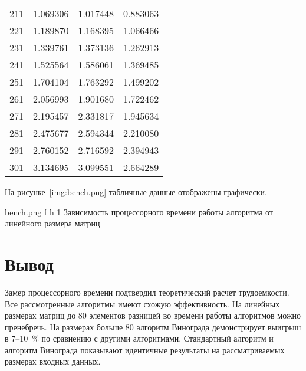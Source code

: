\begin{table}[ht]
\begin{center}
\begin{threeparttable}
\begin{tabular}{|r|r|r|r|}
                211 & 1.069306  & 1.017448  & 0.883063  \\
                221 & 1.189870  & 1.168395  & 1.066466  \\
                231 & 1.339761  & 1.373136  & 1.262913  \\
                241 & 1.525564  & 1.586061  & 1.369485  \\
                251 & 1.704104  & 1.763292  & 1.499202  \\
                261 & 2.056993  & 1.901680  & 1.722462  \\
                271 & 2.195457  & 2.331817  & 1.945634  \\
                281 & 2.475677  & 2.594344  & 2.210080  \\
                291 & 2.760152  & 2.716592  & 2.394943  \\
                301 & 3.134695  & 3.099551  & 2.664289  \\
                \hline
            \end{tabular}
        \end{threeparttable}
    \end{center}
\end{table}

\clearpage

На рисунке~\ref{img:bench.png} табличные данные отображены графически.

{bench.png} %
{f} %
{h} %
{1 \textwidth} %
{Зависимость процессорного времени работы алгоритма от линейного размера матриц} %

\section*{Вывод}

Замер процессорного времени подтвердил теоретический расчет трудоемкости. Все рассмотренные алгоритмы имеют схожую эффективность. На линейных размерах матриц до 80 элементов разницей во времени работы алгоритмов можно пренебречь. На размерах больше 80 алгоритм Винограда демонстрирует выигрыш в 7--10~\% по сравнению с другими алгоритмами. Стандартный алгоритм и алгоритм Винограда показывают идентичные результаты на рассматриваемых размерах входных данных.
